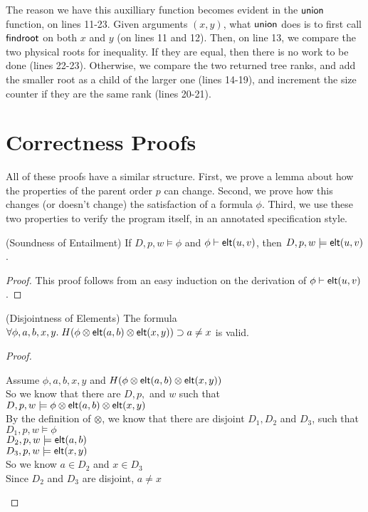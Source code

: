 The reason we have this auxilliary function becomes evident in the
$\mathsf{union}$ function, on lines 11-23. Given arguments $(x,y)$, what
$\mathsf{union}$ does is to first call $\mathsf{findroot}$ on both $x$ and $y$ (on
lines 11 and 12). Then, on line 13, we compare the two physical roots
for inequality. If they are equal, then there is no work to be done
(lines 22-23). Otherwise, we compare the two returned tree ranks, and
add the smaller root as a child of the larger one (lines 14-19), and
increment the size counter if they are the same rank (lines 20-21).

\section{Correctness Proofs}

All of these proofs have a similar structure. First, we prove a lemma about how 
the properties of the parent order $p$ can change. Second, we prove how this changes
(or doesn't change) the satisfaction of a formula $\phi$. Third, we use these
two properties to verify the program itself, in an annotated specification style.




\begin{lemma}{(Soundness of Entailment)}
  If $D, p, w \models \phi$ and ${\phi} \vdash \mathsf{elt}({u}, {v})$, then $D, p, w \models \mathsf{elt}({u}, {v})$. 
\end{lemma}

\begin{proof}
  This proof follows from an easy induction on the derivation of ${\phi} \vdash \mathsf{elt}({u}, {v})$. 
\end{proof}

\begin{lemma}{(Disjointness of Elements)}
  The formula $\forall \phi,a,b,x,y.\;H(\phi \otimes \mathsf{elt}({a}, {b}) \otimes \mathsf{elt}({x}, {y})) \supset a \not= x$
  is valid.   
\end{lemma}
\begin{proof}
  \begin{tabbedproof}
    \oo Assume $\phi,a,b,x,y$ and $H(\phi \otimes \mathsf{elt}({a}, {b}) \otimes \mathsf{elt}({x}, {y}))$ \\
    \ooo So we know that there are $D, p,$ and $w$ such that $D, p, w \models \phi \otimes \mathsf{elt}({a}, {b}) \otimes \mathsf{elt}({x}, {y})$ \\
    \ooo By the definition of $\otimes$, we know that there are disjoint $D_1, D_2$ and $D_3$, such that\\
    \ooox $D_1, p, w \models \phi$ \\
    \ooox $D_2, p, w \models \mathsf{elt}({a}, {b})$ \\
    \ooox $D_3, p, w \models \mathsf{elt}({x}, {y})$ \\
    \ooo So we know $a \in D_2$ and $x \in D_3$ \\
    \ooo Since $D_2$ and $D_3$ are disjoint, $a \not= x$ 
  \end{tabbedproof}
\end{proof}

